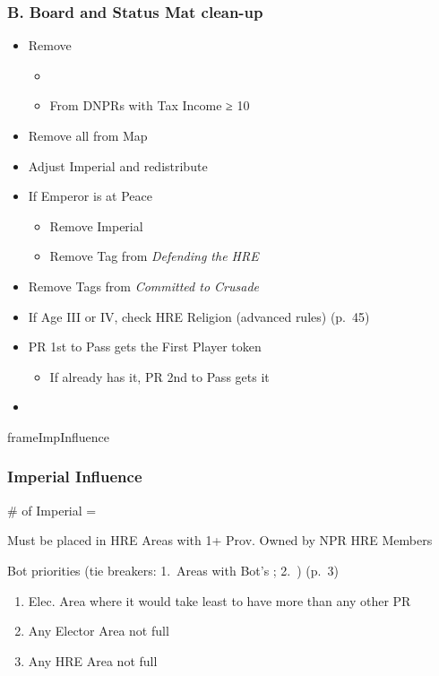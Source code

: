 \documentclass[10pt]{article}
\newlength{\fhImpInfluence} \setlength\fhImpInfluence{10\baselineskip}
\begin{document}
\subsubsection*{B. Board and Status Mat clean-up}
\begin{itemize}
	\item Remove \alliances
	\begin{itemize}
		\item {}
		\item From DNPRs with Tax Income ≥ 10\ducats
	\end{itemize}
	\item Remove all \plague from Map
	\item {}Adjust Imperial \influence and redistribute
	\item If Emperor is at Peace
	\begin{itemize}
		\item Remove Imperial \manpower
		\item Remove Tag from \emph{Defending the HRE}
	\end{itemize}
	\item Remove Tags from \emph{Committed to Crusade}
	\item {}If Age III or IV, check HRE Religion (advanced rules) (p.~45)
	\item PR 1st to Pass gets the First Player token
	\begin{itemize}
		\item If already has it, PR 2nd to Pass gets it
	\end{itemize}
	\item {}
\end{itemize}
\begin{dynamiccontents*}{frameImpInfluence}\begin{eubox}{\fhImpInfluence}
	\subsubsection*{Imperial Influence }
	\begin{itemize}
		\item \# of Imperial \influence = \authority
		\item Must be placed in HRE Areas with 1+ Prov. Owned by NPR HRE Members
		{\botrules
		\item Bot priorities (tie breakers: 1. Areas with Bot's \allies; 2. \az) (p.~3)
		\begin{enumerate}
			\item Elec. Area where it would take least \influence to have more \influence than any other PR
			\item Any Elector Area not full
			\item Any HRE Area not full
		\end{enumerate}
		}
	\end{itemize}
\end{eubox}\end{dynamiccontents*}
\end{document}
